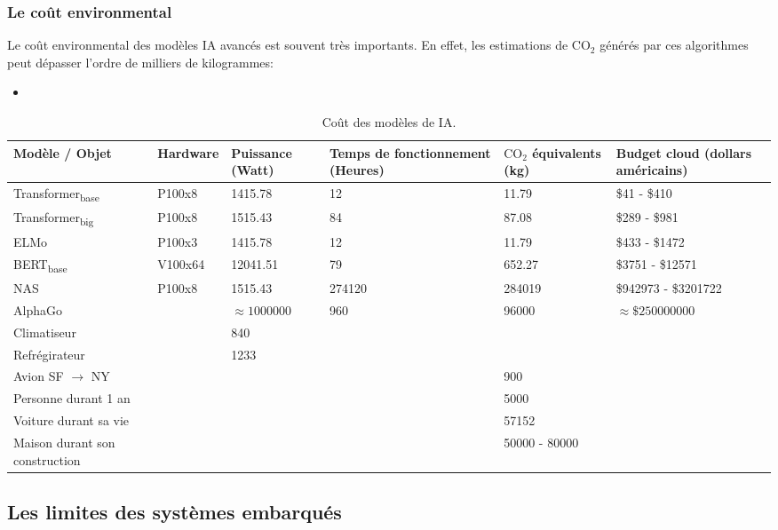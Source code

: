 \subsubsection{Le coût environmental}
Le coût environmental des modèles IA avancés est souvent très importants. 
\newline En effet, les estimations de $\text{CO}_2$ générés par ces algorithmes peut dépasser l'ordre de milliers de kilogrammes:
\begin{itemize}
	\item 
\end{itemize}
\begin{table}[ht]
	\small
	\centering
	\begin{tabularx}{\textwidth}{| p{3cm} | X | X | p{2cm} | p{2.2cm} | p{3cm} |}
		\hline
		Modèle / Objet & Hardware & Puissance (Watt) & Temps de fonctionnement (Heures) & $\text{CO}_2$ équivalents (kg) & Budget cloud (dollars américains) \\
		\hline 
		Transformer\textsubscript{base} & P100x8 & 1415.78 & 12 & 11.79 & \$41 - \$410 \\
		\hline
		Transformer\textsubscript{big} & P100x8 & 1515.43 & 84 & 87.08 & \$289 - \$981 \\
		\hline
		ELMo & P100x3 & 1415.78 & 12 & 11.79 & \$433 - \$1472 \\
		\hline
		BERT\textsubscript{base} & V100x64 & 12041.51 & 79 & 652.27 & \$3751 - \$12571 \\ 
		\hline
		NAS & P100x8 & 1515.43 & 274120 & 284019 & \$942973 - \$3201722 \\
		\hline
		AlphaGo & & $\approx 1000000$ & 960 & 96000 & $\approx \$250000000$ \\ 
		\hline
		Climatiseur& & 840 &  &  & \\
		\hline
		Refrégirateur & & 1233 & & & \\
		\hline
		Avion SF $\rightarrow$ NY  & & & & 900 & \\
		\hline
		Personne durant 1 an & & & & 5000 & \\
		\hline
		Voiture durant sa vie & & & & 57152 & \\
		\hline
		Maison durant son construction \cite{HouseCarbonFootprint} & & & & 50000 - 80000 &  \\
		\hline
	\end{tabularx}
	\caption{Coût des modèles de IA.}
	\label{table:EnergyConsumption}
	
\end{table}
\FloatBarrier
\subsection{Les limites des systèmes embarqués}
\newpage 
